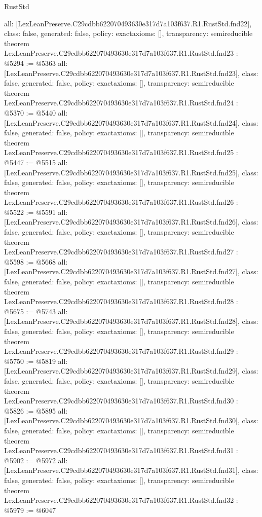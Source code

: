 \begin{lexlean}{RustStd}
\begin{coremodule}
{  all: [LexLeanPreserve.C29cdbb622070493630e317d7a103f637.R1.RustStd.fnd22],
  class: false,
  generated: false,
  policy: exact{axioms: []},
  transparency: semireducible
}
theorem LexLeanPreserve.C29cdbb622070493630e317d7a103f637.R1.RustStd.fnd23 : @5294 := @5363 {
  all: [LexLeanPreserve.C29cdbb622070493630e317d7a103f637.R1.RustStd.fnd23],
  class: false,
  generated: false,
  policy: exact{axioms: []},
  transparency: semireducible
}
theorem LexLeanPreserve.C29cdbb622070493630e317d7a103f637.R1.RustStd.fnd24 : @5370 := @5440 {
  all: [LexLeanPreserve.C29cdbb622070493630e317d7a103f637.R1.RustStd.fnd24],
  class: false,
  generated: false,
  policy: exact{axioms: []},
  transparency: semireducible
}
theorem LexLeanPreserve.C29cdbb622070493630e317d7a103f637.R1.RustStd.fnd25 : @5447 := @5515 {
  all: [LexLeanPreserve.C29cdbb622070493630e317d7a103f637.R1.RustStd.fnd25],
  class: false,
  generated: false,
  policy: exact{axioms: []},
  transparency: semireducible
}
theorem LexLeanPreserve.C29cdbb622070493630e317d7a103f637.R1.RustStd.fnd26 : @5522 := @5591 {
  all: [LexLeanPreserve.C29cdbb622070493630e317d7a103f637.R1.RustStd.fnd26],
  class: false,
  generated: false,
  policy: exact{axioms: []},
  transparency: semireducible
}
theorem LexLeanPreserve.C29cdbb622070493630e317d7a103f637.R1.RustStd.fnd27 : @5598 := @5668 {
  all: [LexLeanPreserve.C29cdbb622070493630e317d7a103f637.R1.RustStd.fnd27],
  class: false,
  generated: false,
  policy: exact{axioms: []},
  transparency: semireducible
}
theorem LexLeanPreserve.C29cdbb622070493630e317d7a103f637.R1.RustStd.fnd28 : @5675 := @5743 {
  all: [LexLeanPreserve.C29cdbb622070493630e317d7a103f637.R1.RustStd.fnd28],
  class: false,
  generated: false,
  policy: exact{axioms: []},
  transparency: semireducible
}
theorem LexLeanPreserve.C29cdbb622070493630e317d7a103f637.R1.RustStd.fnd29 : @5750 := @5819 {
  all: [LexLeanPreserve.C29cdbb622070493630e317d7a103f637.R1.RustStd.fnd29],
  class: false,
  generated: false,
  policy: exact{axioms: []},
  transparency: semireducible
}
theorem LexLeanPreserve.C29cdbb622070493630e317d7a103f637.R1.RustStd.fnd30 : @5826 := @5895 {
  all: [LexLeanPreserve.C29cdbb622070493630e317d7a103f637.R1.RustStd.fnd30],
  class: false,
  generated: false,
  policy: exact{axioms: []},
  transparency: semireducible
}
theorem LexLeanPreserve.C29cdbb622070493630e317d7a103f637.R1.RustStd.fnd31 : @5902 := @5972 {
  all: [LexLeanPreserve.C29cdbb622070493630e317d7a103f637.R1.RustStd.fnd31],
  class: false,
  generated: false,
  policy: exact{axioms: []},
  transparency: semireducible
}
theorem LexLeanPreserve.C29cdbb622070493630e317d7a103f637.R1.RustStd.fnd32 : @5979 := @6047 {
}
\end{coremodule}
\end{lexlean}
